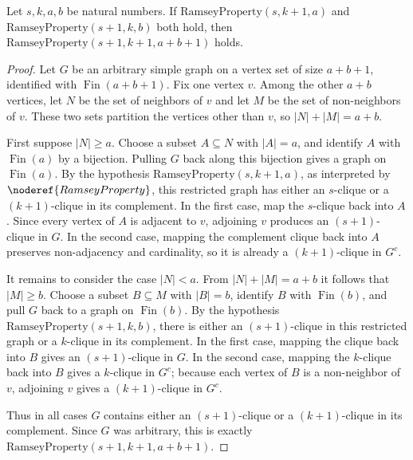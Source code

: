 \begin{helper}
Let \(s,k,a,b\) be natural numbers.  If
\(\mathrm{RamseyProperty}(s,k+1,a)\) and
\(\mathrm{RamseyProperty}(s+1,k,b)\) both hold, then
\(\mathrm{RamseyProperty}(s+1,k+1,a+b+1)\) holds.
\end{helper}
\begin{proof}
Let \(G\) be an arbitrary simple graph on a vertex set of size \(a+b+1\),
identified with \(\operatorname{Fin}(a+b+1)\).  Fix one vertex \(v\).  Among
the other \(a+b\) vertices, let \(N\) be the set of neighbors of \(v\) and let
\(M\) be the set of non-neighbors of \(v\).  These two sets partition the
vertices other than \(v\), so \(|N|+|M|=a+b\).

First suppose \(|N|\ge a\).  Choose a subset \(A\subseteq N\) with
\(|A|=a\), and identify \(A\) with \(\operatorname{Fin}(a)\) by a bijection.
Pulling \(G\) back along this bijection gives a graph on
\(\operatorname{Fin}(a)\).  By the hypothesis
\(\mathrm{RamseyProperty}(s,k+1,a)\), as interpreted by
\(\noderef{RamseyProperty}\), this restricted graph has either an \(s\)-clique
or a \((k+1)\)-clique in its complement.  In the first case, map the
\(s\)-clique back into \(A\).  Since every vertex of \(A\) is adjacent to
\(v\), adjoining \(v\) produces an \((s+1)\)-clique in \(G\).  In the second
case, mapping the complement clique back into \(A\) preserves non-adjacency
and cardinality, so it is already a \((k+1)\)-clique in \(G^{c}\).

It remains to consider the case \(|N|<a\).  From \(|N|+|M|=a+b\) it follows
that \(|M|\ge b\).  Choose a subset \(B\subseteq M\) with \(|B|=b\), identify
\(B\) with \(\operatorname{Fin}(b)\), and pull \(G\) back to a graph on
\(\operatorname{Fin}(b)\).  By the hypothesis
\(\mathrm{RamseyProperty}(s+1,k,b)\), there is either an \((s+1)\)-clique in
this restricted graph or a \(k\)-clique in its complement.  In the first case,
mapping the clique back into \(B\) gives an \((s+1)\)-clique in \(G\).  In the
second case, mapping the \(k\)-clique back into \(B\) gives a \(k\)-clique in
\(G^{c}\); because each vertex of \(B\) is a non-neighbor of \(v\), adjoining
\(v\) gives a \((k+1)\)-clique in \(G^{c}\).

Thus in all cases \(G\) contains either an \((s+1)\)-clique or a
\((k+1)\)-clique in its complement.  Since \(G\) was arbitrary, this is exactly
\(\mathrm{RamseyProperty}(s+1,k+1,a+b+1)\).
\end{proof}
